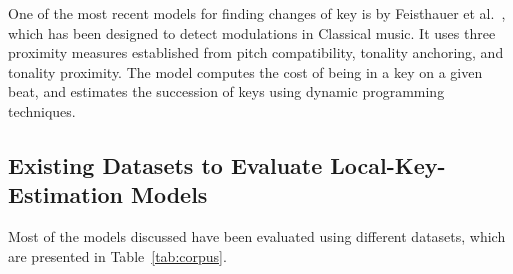 \documentclass[sigconf]{acmart}
\begin{document}
One of the most recent models for finding changes of key is by Feisthauer et al.~\cite{feisthauer2020smc}, which has been designed to detect modulations in Classical music. 
It uses three proximity measures established from pitch compatibility, tonality anchoring, and tonality proximity. 
The model computes the cost of being in a key on a given beat, and estimates the succession of keys using dynamic programming techniques.



\subsection{Existing Datasets to Evaluate Local-Key-Estimation Models}

Most of the models discussed have been evaluated using different datasets, which are presented in Table~\ref{tab:corpus}.
\end{document}
